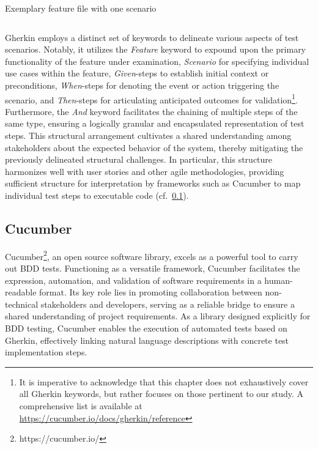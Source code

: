 \begin{listing}[!ht]
\caption{Exemplary feature file with one scenario}
\label{lst:withdrawcash}
\inputminted{gherkin}{files/code/atm.feature}
\end{listing}

 Gherkin employs a distinct set of keywords to delineate various aspects of test scenarios. Notably, it utilizes the \textit{Feature} keyword to expound upon the primary functionality of the feature under examination, \textit{Scenario} for specifying individual use cases within the feature, \textit{Given}-steps to establish initial context or preconditions, \textit{When}-steps for denoting the event or action triggering the scenario, and \textit{Then}-steps for articulating anticipated outcomes for validation\footnote{It is imperative to acknowledge that this chapter does not exhaustively cover all Gherkin keywords, but rather focuses on those pertinent to our study. A comprehensive list is available at \href{https://cucumber.io/docs/gherkin/reference/\#keywords}{https://cucumber.io/docs/gherkin/reference}}. Furthermore, the \textit{And} keyword facilitates the chaining of multiple steps of the same type, ensuring a logically granular and encapsulated representation of test steps. This structural arrangement cultivates a shared understanding among stakeholders about the expected behavior of the system, thereby mitigating the previously delineated structural challenges. In particular, this structure harmonizes well with user stories and other agile methodologies, providing sufficient structure for interpretation by frameworks such as Cucumber to map individual test steps to executable code (cf.~\cref{subsec:cucumber}).~\cite{noauthor_gherkin_nodate}


\subsection{Cucumber}
\label{subsec:cucumber}
Cucumber\footnote{https://cucumber.io/}, an open source software library, excels as a powerful tool to carry out \ac{BDD} tests. Functioning as a versatile framework, Cucumber facilitates the expression, automation, and validation of software requirements in a human-readable format. Its key role lies in promoting collaboration between non-technical stakeholders and developers, serving as a reliable bridge to ensure a shared understanding of project requirements. As a library designed explicitly for BDD testing, Cucumber enables the execution of automated tests based on Gherkin, effectively linking natural language descriptions with concrete test implementation steps.

